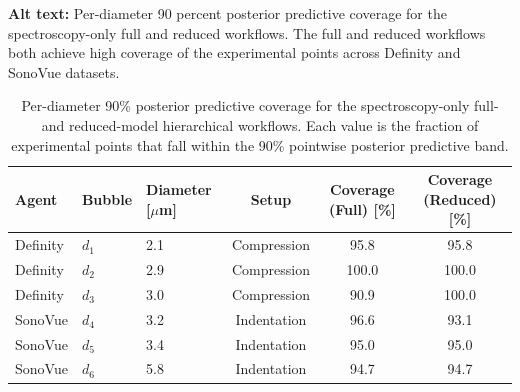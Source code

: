 \documentclass[%
 aip,
 jcp,
 amsmath,amssymb,
 preprint,%
]{revtex4-1}
\begin{document}
\begin{table}[!htbp]
\caption{\label{tab:coverage}
Per-diameter 90\% posterior predictive coverage for the spectroscopy-only full- and reduced-model hierarchical workflows. Each value is the fraction of experimental points that fall within the
90\% pointwise posterior predictive band.}
\noindent\textbf{Alt text:} Per-diameter 90 percent posterior predictive coverage for the spectroscopy-only full and reduced workflows. The full and reduced workflows both achieve high coverage of the experimental points across Definity and SonoVue datasets.
\par\vspace{0.75\baselineskip}
\begin{ruledtabular}
\begin{tabular}{lllccc}
Agent & Bubble & Diameter [$\mu$m] & Setup & Coverage (Full) [\%] & Coverage (Reduced) [\%] \\
\hline
Definity & $d_1$ & 2.1 & Compression & 95.8 & 95.8 \\
Definity & $d_2$ & 2.9 & Compression & 100.0 & 100.0 \\
Definity & $d_3$ & 3.0 & Compression & 90.9 & 100.0 \\
\hline
SonoVue & $d_4$ & 3.2 & Indentation & 96.6 & 93.1 \\
SonoVue & $d_5$ & 3.4 & Indentation & 95.0 & 95.0 \\
SonoVue & $d_6$ & 5.8 & Indentation & 94.7 & 94.7 \\
\end{tabular}
\end{ruledtabular}
\end{table}
\end{document}
